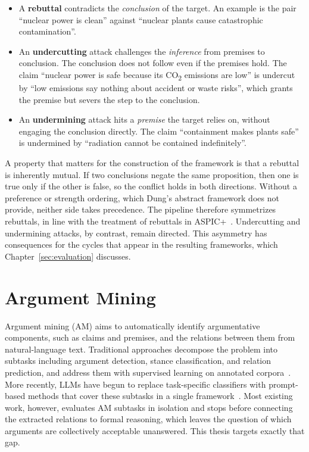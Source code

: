 \begin{itemize}
  \item A \textbf{rebuttal} contradicts the \emph{conclusion} of the target. An
    example is the pair ``nuclear power is clean'' against ``nuclear plants cause
    catastrophic contamination''.
  \item An \textbf{undercutting} attack challenges the \emph{inference} from
    premises to conclusion. The conclusion does not follow even if the premises
    hold. The claim ``nuclear power is safe because its CO\textsubscript{2}
    emissions are low'' is undercut by ``low emissions say nothing about
    accident or waste risks'', which grants the premise but severs the step to
    the conclusion.
  \item An \textbf{undermining} attack hits a \emph{premise} the target relies
    on, without engaging the conclusion directly. The claim ``containment makes
    plants safe'' is undermined by ``radiation cannot be contained
    indefinitely''.
\end{itemize}

A property that matters for the construction of the framework is that a rebuttal
is inherently mutual. If two conclusions negate the same proposition, then one is
true only if the other is false, so the conflict holds in both directions.
Without a preference or strength ordering, which Dung's abstract framework does
not provide, neither side takes precedence. The pipeline therefore symmetrizes
rebuttals, in line with the treatment of rebuttals in ASPIC+~\cite{modgil2014}.
Undercutting and undermining attacks, by contrast, remain directed. This
asymmetry has consequences for the cycles that appear in the resulting
frameworks, which Chapter~\ref{sec:evaluation} discusses.

\section{Argument Mining}
\label{sec:foundations:am}

Argument mining (AM) aims to automatically identify argumentative components,
such as claims and premises, and the relations between them from natural-language
text. Traditional approaches decompose the problem into subtasks including
argument detection, stance classification, and relation prediction, and address
them with supervised learning on annotated corpora~\cite{lawrence2019argument}.
More recently, LLMs have begun to replace task-specific classifiers with
prompt-based methods that cover these subtasks in a single
framework~\cite{li2025large}. Most existing work, however, evaluates AM
subtasks in isolation and stops before connecting the extracted relations to
formal reasoning, which leaves the question of which arguments are collectively
acceptable unanswered. This thesis targets exactly that gap.

